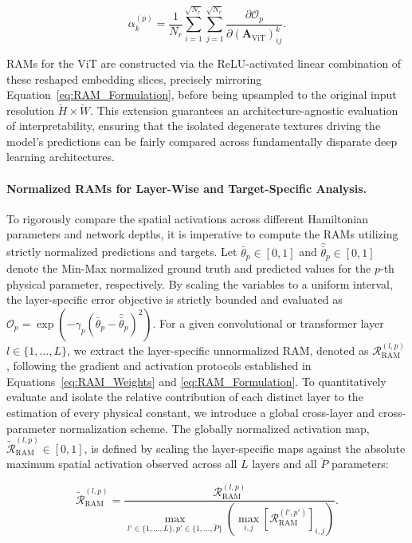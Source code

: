 \documentclass[letterpaper, 12, one column]{article}
\begin{document}
\begin{equation}\label{eq:ViT_Weights}
\alpha_k^{(p)} = \frac{1}{N_r} \sum_{i=1}^{\sqrt{N_r}} \sum_{j=1}^{\sqrt{N_r}} \frac{\partial \mathcal{O}_p}{\partial (\mathbf{A}_{\text{ViT}})_{ij}^k}.
\end{equation}

RAMs for the ViT are constructed via the ReLU-activated linear combination of these reshaped embedding slices, precisely mirroring Equation~\ref{eq:RAM_Formulation}, before being upsampled to the original input resolution $\breve{H} \times \breve{W}$. This extension guarantees an architecture-agnostic evaluation of interpretability, ensuring that the isolated degenerate textures driving the model's predictions can be fairly compared across fundamentally disparate deep learning architectures.

\paragraph{Normalized RAMs for Layer-Wise and Target-Specific Analysis.}\label{sec:Nor_RAMs}

To rigorously compare the spatial activations across different Hamiltonian parameters and network depths, it is imperative to compute the RAMs utilizing strictly normalized predictions and targets. Let $\bar{\theta}_p \in [0,1]$ and $\hat{\bar{\theta}}_p \in [0,1]$ denote the Min-Max normalized ground truth and predicted values for the $p$-th physical parameter, respectively. By scaling the variables to a uniform interval, the layer-specific error objective is strictly bounded and evaluated as $\mathcal{O}_p = \exp(-\gamma_p (\bar{\theta}_p - \hat{\bar{\theta}}_p)^2)$. For a given convolutional or transformer layer $l \in \{1, \dots, L\}$, we extract the layer-specific unnormalized RAM, denoted as $\mathcal{R}_{\text{RAM}}^{(l,p)}$, following the gradient and activation protocols established in Equations~\ref{eq:RAM_Weights} and \ref{eq:RAM_Formulation}. To quantitatively evaluate and isolate the relative contribution of each distinct layer to the estimation of every physical constant, we introduce a global cross-layer and cross-parameter normalization scheme. The globally normalized activation map, $\tilde{\mathcal{R}}_{\text{RAM}}^{(l,p)}\in[0,1]$, is defined by scaling the layer-specific maps against the absolute maximum spatial activation observed across all $L$ layers and all $\breve{P}$ parameters:

\begin{equation}\label{eq:RAM_Global_Norm}
\tilde{\mathcal{R}}_{\text{RAM}}^{(l,p)} = \frac{\mathcal{R}_{\text{RAM}}^{(l,p)}}{\max\limits_{l' \in \{1,\dots,L\}, p' \in \{1,\dots,\breve{P}\}} \left( \max\limits_{i,j} \left[ \mathcal{R}_{\text{RAM}}^{(l',p')}\right]_{i,j} \right)}.
\end{equation}
\end{document}
